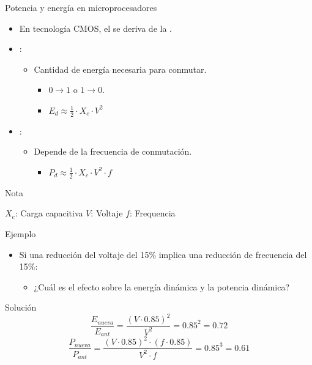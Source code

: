 \begin{frame}[t]{Potencia y energía en microprocesadores}
\begin{itemize}
  \item En tecnología CMOS, el  se deriva de la
        .

  \item {}:
    \begin{itemize}
      \item Cantidad de energía necesaria para conmutar.
        \begin{itemize}
          \item $0 \rightarrow 1$ o $1 \rightarrow 0$.
          \item $E_d \approx \frac{1}{2} \cdot X_c \cdot V^2$
        \end{itemize}
    \end{itemize}

  \item {}:
    \begin{itemize}
      \item Depende de la frecuencia de conmutación.
        \begin{itemize}
          \item $P_d \approx \frac{1}{2} \cdot X_c \cdot V^2 \cdot f$
        \end{itemize}
    \end{itemize}
\end{itemize}
\begin{block}{Nota}
\begin{small}
  $X_c$: Carga capacitiva\qquad
  $V$: Voltaje \qquad
  $f$: Frequencia
\end{small}
\end{block}
\end{frame}

\begin{frame}[t]{Ejemplo}
\begin{itemize}
  \item Si una reducción del voltaje del 15\% implica una reducción de frecuencia del 15\%:
    \begin{itemize}
      \item ¿Cuál es el efecto sobre la energía dinámica y la potencia dinámica?
    \end{itemize}
\end{itemize}

\begin{block}{Solución}
\begin{displaymath}
\frac{E_{nueva}}{E_{ant}} =
\frac
{(V \cdot 0.85)^2}
{V^2} =
0.85^2 =
0.72
\end{displaymath}
\pause
\begin{displaymath}
\frac{P_{nueva}}{P_{ant}} =
\frac
{(V \cdot 0.85)^2 \cdot (f \cdot 0.85)}
{V^2 \cdot f} =
0.85^3 =
0.61
\end{displaymath}
\end{block}
\end{frame}

